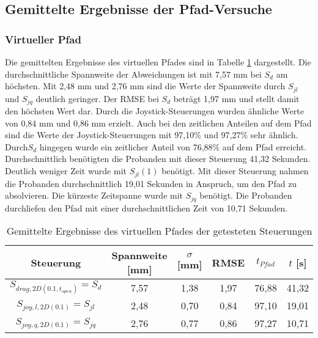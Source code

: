 \subsection{Gemittelte Ergebnisse der Pfad-Versuche}
\subsubsection{Virtueller Pfad}
Die gemittelten Ergebnisse des virtuellen Pfades sind in Tabelle \ref{table pfad all} dargestellt. Die durchschnittliche Spannweite der Abweichungen ist mit 7,57 mm bei $S_{d}$ am höchsten. Mit 2,48 mm und 2,76 mm sind die Werte der Spannweite durch $S_{jl}$ und $S_{jq}$ deutlich geringer. Der RMSE bei $S_{d}$ beträgt 1,97 mm und stellt damit den höchsten Wert dar. Durch die Joystick-Steuerungen wurden ähnliche Werte von 0,84 mm und 0,86 mm erzielt. Auch bei den zeitlichen Anteilen auf dem Pfad sind die Werte der Joystick-Steuerungen mit 97,10\% und 97,27\% sehr ähnlich. Durch$S_{d}$ hingegen wurde ein zeitlicher Anteil von 76,88\% auf dem Pfad erreicht. Durchschnittlich benötigten die Probanden mit dieser Steuerung 41,32 Sekunden. Deutlich weniger Zeit wurde mit $S_{jl}(1)$ benötigt. Mit dieser Steuerung nahmen die Probanden durchschnittlich 19,01 Sekunden in Anspruch, um den Pfad zu absolvieren. Die kürzeste Zeitspanne wurde mit $S_{jq}$ benötigt. Die Probanden durchliefen den Pfad mit einer durchschnittlichen Zeit von 10,71 Sekunden.


\begin{table}[htb]
	\caption{Gemittelte Ergebnisse des virtuellen Pfades der getesteten Steuerungen}
	\label{table pfad all}
	\begin{center}
		\begin{tabular}{ |c|c|c|c|c|c| }
			\hline
			Steuerung & Spannweite [mm] & $\sigma$ [mm] & RMSE & $t_{Pfad}$  & $t$ [s] \\
			\hline
			$S_{drag,2D(0.1,t_{open})}=S_{d}$ & 7,57 & 1,38 & 1,97 & 76,88 & 41,32 \\
			\hline
			$S_{joy,l,2D(0.1)}=S_{jl}$ & 2,48 & 0,70 & 0,84 & 97,10  & 19,01\\
			\hline
			$S_{joy,q,2D(0.1)}=S_{jq}$ & 2,76 & 0,77 & 0,86  & 97,27 & 10,71\\
			\hline
		\end{tabular}
	\end{center}
\end{table}

